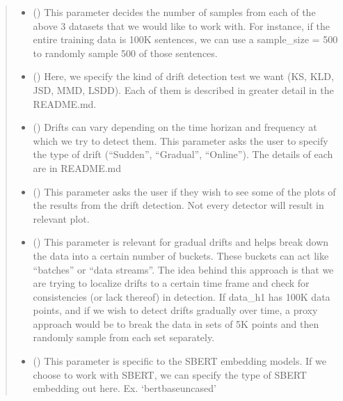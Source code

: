 \documentclass[letterpaper,10pt,english]{sphinxmanual}
\begin{document}
\begin{fulllineitems}
\begin{fulllineitems}
\begin{quote}
\begin{description}
\begin{itemize}
\item {} 
\sphinxAtStartPar
{} () \textendash{} This parameter decides the number of samples from each of the above 3 datasets that we would
like to work with. For instance, if the entire training data is 100K sentences, we can use
a sample\_size = 500 to randomly sample 500 of those sentences.

\item {} 
\sphinxAtStartPar
{} () \textendash{} Here, we specify the kind of drift detection test we want (KS, KLD, JSD, MMD, LSDD).
Each of them is described in greater detail in the README.md.

\item {} 
\sphinxAtStartPar
{} () \textendash{} Drifts can vary depending on the time horizan and frequency at which we try to detect
them. This parameter asks the user to specify the type of drift (“Sudden”, “Gradual”,
“Online”). The details of each are in README.md

\item {} 
\sphinxAtStartPar
{} () \textendash{} This parameter asks the user if they wish to see some of the plots of the results
from the drift detection. Not every detector will result in relevant plot.

\item {} 
\sphinxAtStartPar
{} () \textendash{} This parameter is relevant for gradual drifts and helps break down the data into a
certain number of buckets. These buckets can act like “batches” or “data streams”.
The idea behind this approach is that we are trying to localize drifts to a certain
time frame and check for consistencies (or lack thereof) in detection.
If data\_h1 has 100K data points, and if we wish to detect drifts
gradually over time, a proxy approach would be to break the data in sets of 5K points
and then randomly sample from each set separately.

\item {} 
\sphinxAtStartPar
{} () \textendash{} This parameter is specific to the SBERT embedding models. If we choose to work with SBERT,
we can specify the type of SBERT embedding out here. Ex. ‘bert\sphinxhyphen{}base\sphinxhyphen{}uncased’


\end{itemize}
\end{description}
\end{quote}
\end{fulllineitems}
\end{fulllineitems}
\end{document}
